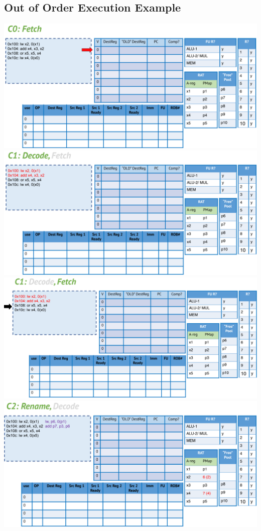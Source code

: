 \documentclass[10pt]{article}
\begin{document}
\subsection*{Out of Order Execution Example}
\begin{center}
\includegraphics*[width=\textwidth]{W5_out_of_order/0.png}\\
\includegraphics*[width=\textwidth]{W5_out_of_order/1.png}\\
\includegraphics*[width=\textwidth]{W5_out_of_order/2.png}\\
\includegraphics*[width=\textwidth]{W5_out_of_order/3.png}\\

\end{center}
\end{document}
